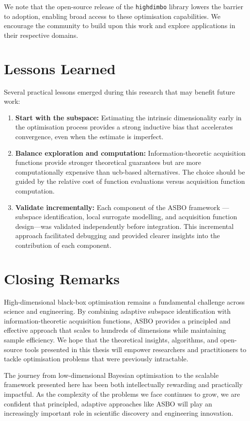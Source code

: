 We note that the open-source release of the \texttt{highdimbo} library lowers
the barrier to adoption, enabling broad access to these optimisation
capabilities.  We encourage the community to build upon this work and explore
applications in their respective domains.

\section{Lessons Learned}
\label{sec:lessons}

Several practical lessons emerged during this research that may benefit future
work:

\begin{enumerate}
    \item \textbf{Start with the subspace:} Estimating the intrinsic
    dimensionality early in the optimisation process provides a strong inductive
    bias that accelerates convergence, even when the estimate is imperfect.

    \item \textbf{Balance exploration and computation:} Information-theoretic
    acquisition functions provide stronger theoretical guarantees but are more
    computationally expensive than \gls{ucb}-based alternatives.  The choice
    should be guided by the relative cost of function evaluations versus
    acquisition function computation.

    \item \textbf{Validate incrementally:} Each component of the ASBO framework
   ---subspace identification, local surrogate modelling, and acquisition
    function design---was validated independently before integration.  This
    incremental approach facilitated debugging and provided clearer insights
    into the contribution of each component.
\end{enumerate}

\section{Closing Remarks}
\label{sec:closing}

High-dimensional black-box optimisation remains a fundamental challenge across
science and engineering.  By combining adaptive subspace identification with
information-theoretic acquisition functions, ASBO provides a principled and
effective approach that scales to hundreds of dimensions while maintaining
sample efficiency.  We hope that the theoretical insights, algorithms, and
open-source tools presented in this thesis will empower researchers and
practitioners to tackle optimisation problems that were previously intractable.

The journey from low-dimensional Bayesian optimisation to the scalable
framework presented here has been both intellectually rewarding and practically
impactful.  As the complexity of the problems we face continues to grow, we are
confident that principled, adaptive approaches like ASBO will play an
increasingly important role in scientific discovery and engineering innovation.
